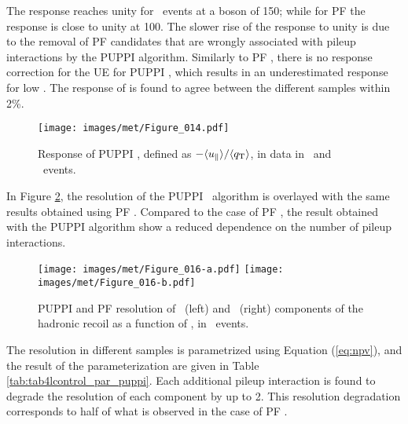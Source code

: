 The response reaches unity for \Zmm\ events at a boson \pt of 150\GeV; while for PF \ptmiss the response is close to unity at 100\GeV. 
The slower rise of the response to unity is due to the removal of PF candidates that are wrongly associated with pileup interactions by the PUPPI algorithm. 
Similarly to PF \ptmiss, there is no response correction for the UE for PUPPI \ptmiss, which results in an underestimated response for low \qt. 
The response of \ptmiss is found to agree between the different samples within 2\%. 
\begin{figure}[htbp!]
  \centering
   \texttt{[image: images/met/Figure\_014.pdf]}
  \caption{Response of PUPPI \ptmiss, defined as $-\langle u_\Vert \rangle /\langle {q}_{\mathrm T} \rangle$, in data in \Zmm\ and \Zee\ events. }
  \label{fig:response_puppi}
\end{figure}
\newpara
\noindent\justify
In Figure \ref{fig:Res_vs_PileUpHighPU}, the resolution of the PUPPI \ptmiss\ algorithm is overlayed with the same results obtained using PF \ptmiss. 
Compared to the case of PF \ptmiss, the result obtained with the PUPPI algorithm show a reduced dependence on the number of pileup interactions.
\begin{figure}[htbp!]
  \centering
   \texttt{[image: images/met/Figure\_016-a.pdf]}
   \texttt{[image: images/met/Figure\_016-b.pdf]}
   \caption{PUPPI and PF \ptmiss resolution of \upar\ (left) and \uperp\ (right) components of the hadronic recoil as a function of \nvtx, in \Zmm\ events.} 
   \label{fig:Res_vs_PileUpHighPU}
\end{figure}
The resolution in different samples is parametrized using Equation (\ref{eq:npv}), and the result of the parameterization are given in Table \ref{tab:tab4lcontrol_par_puppi}. 
Each additional pileup interaction is found to degrade the resolution of each component by up to 2\GeV. This resolution degradation corresponds to half of what is observed in the case of PF \ptmiss.
